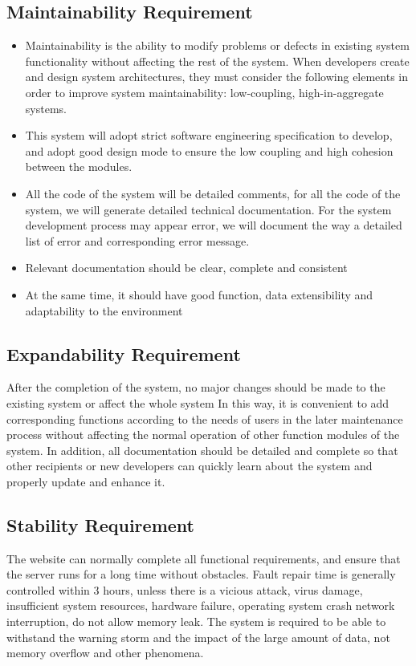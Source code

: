 \documentclass[16pt]{scrreprt}
\begin{document}
\subsection{Maintainability Requirement}
\begin{itemize}
    \item Maintainability is the ability to modify problems or defects in existing system functionality without affecting the rest of the system.
When developers create and design system architectures, they must consider the following elements in order to improve system maintainability: low-coupling, high-in-aggregate systems.
    \item This system will adopt strict software engineering specification to develop, and adopt good design mode to ensure the low coupling and high cohesion between the modules.
    \item All the code of the system will be detailed comments, for all the code of the system, we will generate detailed technical documentation.
For the system development process may appear error, we will document the way a detailed list of error and corresponding error message.
    \item Relevant documentation should be clear, complete and consistent
    \item At the same time, it should have good function, data extensibility and adaptability to the environment
\end{itemize}

\subsection{Expandability Requirement}
After the completion of the system, no major changes should be made to the existing system or affect the whole system
In this way, it is convenient to add corresponding functions according to the needs of users in the later maintenance process without affecting the normal operation of other function modules of the system.
In addition, all documentation should be detailed and complete so that other recipients or new developers can quickly learn about the system and properly update and enhance it.

\subsection{Stability Requirement}
The website can normally complete all functional requirements, and ensure that the server runs for a long time without obstacles.
Fault repair time is generally controlled within 3 hours, unless there is a vicious attack, virus damage, insufficient system resources, hardware failure, operating system crash network interruption, do not allow memory leak.
The system is required to be able to withstand the warning storm and the impact of the large amount of data, not memory overflow and other phenomena.
\end{document}

